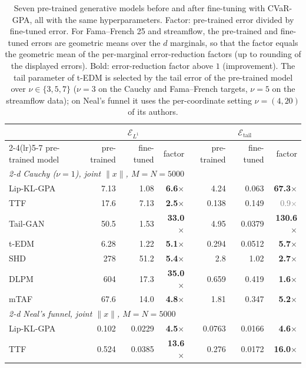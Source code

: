\begin{table}[t]
\centering\small\setlength{\tabcolsep}{4.5pt}
\caption{Seven pre-trained generative models before and after fine-tuning with CVaR-GPA, all with the same hyperparameters. Factor: pre-trained error divided by fine-tuned error. {For Fama--French 25 and streamflow, the pre-trained and fine-tuned errors are geometric means over the $d$ marginals, so that the factor equals the geometric mean of the per-marginal error-reduction factors (up to rounding of the displayed errors).} Bold: error-reduction factor above $1$ (improvement). The tail parameter of t-EDM is selected by the tail error of the pre-trained model over $\nu\in\{3,5,7\}$ ($\nu=3$ on the Cauchy and Fama--French targets, $\nu=5$ on the streamflow data); on Neal's funnel it uses the per-coordinate setting $\nu=(4,20)$ of its authors.}
\label{tab:headline}
\begin{tabular}{l rrr rrr}\toprule
 & \multicolumn{3}{c}{$\mathcal{E}_{L^1}$} & \multicolumn{3}{c}{$\mathcal{E}_{\mathrm{tail}}$}\\ \cmidrule(lr){2-4}\cmidrule(lr){5-7}
pre-trained model & pre-trained & fine-tuned & factor & pre-trained & fine-tuned & factor\\
\midrule
\multicolumn{7}{l}{\textit{2-d Cauchy ($\nu=1$), joint $\|x\|$, $M{=}N{=}5000$}}\\[1pt]
Lip-KL-GPA & 7.13 & 1.08 & \textbf{6.6}$\times$ & 4.24 & 0.063 & \textbf{67.3}$\times$\\
TTF & 17.6 & 7.13 & \textbf{2.5}$\times$ & 0.138 & 0.149 & \textcolor{gray}{0.9$\times$}\\
Tail-GAN & 50.5 & 1.53 & \textbf{33.0}$\times$ & 4.95 & 0.0379 & \textbf{130.6}$\times$\\
t-EDM & 6.28 & 1.22 & \textbf{5.1}$\times$ & 0.294 & 0.0512 & \textbf{5.7}$\times$\\
SHD & 278 & 51.2 & \textbf{5.4}$\times$ & 2.8 & 1.02 & \textbf{2.7}$\times$\\
DLPM & 604 & 17.3 & \textbf{35.0}$\times$ & 0.659 & 0.419 & \textbf{1.6}$\times$\\
mTAF & 67.6 & 14.0 & \textbf{4.8}$\times$ & 1.81 & 0.347 & \textbf{5.2}$\times$\\
\midrule
\multicolumn{7}{l}{\textit{2-d  Neal's funnel, joint $\|x\|$, $M{=}N{=}5000$}}\\[1pt]
Lip-KL-GPA & 0.102 & 0.0229 & \textbf{4.5}$\times$ & 0.0763 & 0.0166 & \textbf{4.6}$\times$\\
TTF & 0.524 & 0.0385 & \textbf{13.6}$\times$ & 0.276 & 0.0172 & \textbf{16.0}$\times$\\

\end{tabular}
\end{table}

